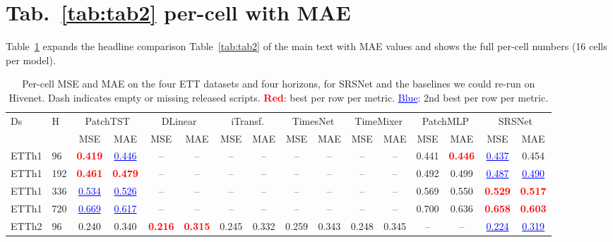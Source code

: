 \section{Tab.~\ref{tab:tab2} per-cell with MAE}
\label{app:tab2-mae}

Table~\ref{tab:tab2-mae} expands the headline comparison
Table~\ref{tab:tab2} of the main text with MAE values and shows
the full per-cell numbers (16 cells per model).

\begin{table}[h]
  \caption{Per-cell MSE and MAE on the four ETT datasets and
    four horizons, for SRSNet and the baselines we could
    re-run on Hivenet. Dash indicates empty or missing released scripts. \textcolor{red}{\textbf{Red}}: best per row per
    metric. \textcolor{blue}{\underline{Blue}}: 2nd best per
    row per metric.}
  \label{tab:tab2-mae}
  \begin{center}
  \tiny
  \setlength{\tabcolsep}{1.5pt}
  \begin{tabular}{ll|cc|cc|cc|cc|cc|cc|cc}
    \toprule
    Ds & H & \multicolumn{2}{c|}{PatchTST} & \multicolumn{2}{c|}{DLinear} & \multicolumn{2}{c|}{iTransf.} & \multicolumn{2}{c|}{TimesNet} & \multicolumn{2}{c|}{TimeMixer} & \multicolumn{2}{c|}{PatchMLP} & \multicolumn{2}{c}{SRSNet} \\
       &   & MSE & MAE & MSE & MAE & MSE & MAE & MSE & MAE & MSE & MAE & MSE & MAE & MSE & MAE \\
    \midrule
    ETTh1 & 96  & \textcolor{red}{\textbf{0.419}} & \textcolor{blue}{\underline{0.446}} & -- & -- & -- & -- & -- & -- & -- & -- & 0.441 & \textcolor{red}{\textbf{0.446}} & \textcolor{blue}{\underline{0.437}} & 0.454 \\
    ETTh1 & 192 & \textcolor{red}{\textbf{0.461}} & \textcolor{red}{\textbf{0.479}} & -- & -- & -- & -- & -- & -- & -- & -- & 0.492 & 0.499 & \textcolor{blue}{\underline{0.487}} & \textcolor{blue}{\underline{0.490}} \\
    ETTh1 & 336 & \textcolor{blue}{\underline{0.534}} & \textcolor{blue}{\underline{0.526}} & -- & -- & -- & -- & -- & -- & -- & -- & 0.569 & 0.550 & \textcolor{red}{\textbf{0.529}} & \textcolor{red}{\textbf{0.517}} \\
    ETTh1 & 720 & \textcolor{blue}{\underline{0.669}} & \textcolor{blue}{\underline{0.617}} & -- & -- & -- & -- & -- & -- & -- & -- & 0.700 & 0.636 & \textcolor{red}{\textbf{0.658}} & \textcolor{red}{\textbf{0.603}} \\
    \midrule
    ETTh2 & 96  & 0.240 & 0.340 & \textcolor{red}{\textbf{0.216}} & \textcolor{red}{\textbf{0.315}} & 0.245 & 0.332 & 0.259 & 0.343 & 0.248 & 0.345 & -- & -- & \textcolor{blue}{\underline{0.224}} & \textcolor{blue}{\underline{0.319}} \\

\end{tabular}
\end{center}
\end{table}
